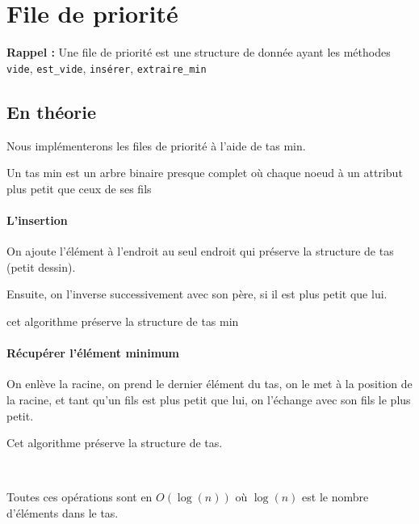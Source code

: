 \section{File de priorité}

\textbf{Rappel :} Une file de priorité est une structure de donnée ayant les méthodes \texttt{vide}, \texttt{est\_vide}, \texttt{insérer}, \texttt{extraire\_min}

\subsection{En théorie}

\begin{idee} 
	Nous implémenterons les files de priorité à l'aide de tas min.
\end{idee}

\begin{definition}
	Un tas min est un arbre binaire presque complet où chaque noeud à un attribut plus petit que ceux de ses fils
\end{definition}

\paragraph{L'insertion}
	On ajoute l'élément à l'endroit au seul endroit qui préserve la structure de tas (petit dessin).
	
	Ensuite, on l'inverse successivement avec son père, si il est plus petit que lui.

	\begin{theorem}
		cet algorithme préserve la structure de tas min
	\end{theorem}

\paragraph{Récupérer l'élément minimum}

	On enlève la racine, on prend le dernier élément du tas, on le met à la position de la racine, et tant qu'un fils est plus petit que lui, on l'échange avec son fils le plus petit.

	\begin{theorem}
		Cet algorithme préserve la structure de tas.
	\end{theorem}
\enspace \\
\begin{theorem}
	Toutes ces opérations sont en $O(\log(n))$ où $\log(n)$ est le nombre d'éléments dans le tas.
\end{theorem}

